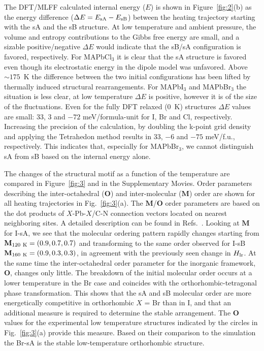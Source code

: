 \documentclass[journal=jpccck,manuscript=article,layout=twocolumn]{achemso}
\begin{document}
The DFT/MLFF calculated internal energy ($E$) is shown in Figure~\ref{fig:2}(b) as the energy difference ($\Delta{}E=E_{\rm sA}-E_{\rm sB}$) between the heating trajectory starting with the sA and the sB structure. At low temperature and ambient pressure, the volume and entropy contributions to the Gibbs free energy are small, and a sizable positive/negative $\Delta{}E$ would indicate that the sB/sA configuration is favored, respectively. For MAPbCl$_3$ it is clear that the sA structure is favored even though its electrostatic energy in the dipole model was unfavored. Above $\sim 175$~K the difference between the two initial configurations has been lifted by thermally induced structural rearrangements. For MAPbI$_3$ and MAPbBr$_3$ the situation is less clear, at low temperature $\Delta{}E$ is positive, however it is of the size of the fluctuations. Even for the fully DFT relaxed (0~K) structures $\Delta{}E$ values are small: 33, $3$ and $-72$ meV/formula-unit for I, Br and Cl, respectively. Increasing the precision of the calculation, by doubling the k-point grid density and applying the Tetrahedon method\cite{Blochl:prb94a} results in 33, $-6$ and $-75$ meV/f.u., respectively. This indicates that, especially for MAPbBr$_3$, we cannot distinguish sA from sB based on the internal energy alone.\newline{}


The changes of the structural motif as a function of the temperature are compared in Figure~\ref{fig:3} and in the Supplementary Movies. Order parameters describing the inter-octahedral ($\mathbf{O}$) and inter-molecular ($\mathbf{M}$) order are shown for all heating trajectories in Fig.~\ref{fig:3}(a). The $\mathbf{M}$/$\mathbf{O}$ order parameters are based on the dot products of $X$-Pb-$X$/C-N connection vectors located on nearest neighboring sites.
A detailed description can be found in Refs.~\cite{Lahnsteiner:prb19,Jinnouchi:prl19}. Looking at $\mathbf{M}$ for I-sA, we see that the molecular ordering pattern rapidly changes starting from  $\mathbf{M}_{\rm 120~K}=\left(0.9,0.7,0.7\right)$ and transforming to the same order observed for I-sB $\mathbf{M}_{\rm 160~K}=\left(0.9,0.3,0.3\right)$, in agreement with the previously seen change in $H_{\rm lr}$. At the same time the inter-octahedral order parameter for the inorganic framework, $\mathbf{O}$, changes only little. The breakdown of the initial molecular order occurs at a lower temperature in the Br case and coincides with the orthorhombic-tetragonal phase transformation. This shows that the sA and sB molecular order are more energetically competitive in orthorhombic $X$ = Br than in I, and that an additional measure is required to determine the stable arrangement. The $\mathbf{O}$ values for the experimental low temperature structures indicated by the circles in Fig.~\ref{fig:3}(a) provide this measure. Based on their comparison to the simulation the Br-sA is the stable low-temperature orthorhombic structure.\newline{}
\end{document}
